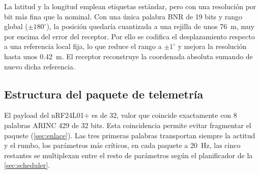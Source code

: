 La latitud y la longitud emplean etiquetas estándar, pero con una resolución por
bit más fina que la nominal. Con una única palabra BNR de 19 bits y rango global
(\(\pm 180^{\circ}\)), la posición quedaría cuantizada a una rejilla de unos
\SI{76}{\meter}, muy por encima del error del receptor. Por ello se codifica el
desplazamiento respecto a una referencia local fija, lo que reduce el rango a
\(\pm 1^{\circ}\) y mejora la resolución hasta unos \SI{0.42}{\meter}. El receptor
reconstruye la coordenada absoluta sumando de nuevo dicha referencia.

\subsection{Estructura del paquete de telemetría}
\label{sec:estructura_paquete}

El payload del nRF24L01+ es de \SI{32}{\byte}, valor que coincide exactamente con 8
palabras ARINC 429 de 32 bits. Esta coincidencia permite evitar fragmentar el paquete
(\cref{sec:enlace}). Las tres primeras palabras transportan siempre la actitud y
el rumbo, los parámetros más críticos, en cada paquete a \SI{20}{\hertz}, las
cinco restantes se multiplexan entre el resto de parámetros según el
planificador de la \cref{sec:scheduler}.

